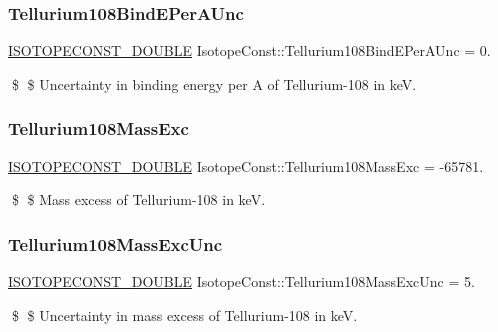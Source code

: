 \subsubsection{\texorpdfstring{Tellurium108\+Bind\+E\+Per\+A\+Unc}{Tellurium108BindEPerAUnc}}
{\footnotesize\ttfamily \mbox{\hyperlink{group___isotope_const-_macros_ga8f45a7272ce02c0b4c65c44636ed719a}{I\+S\+O\+T\+O\+P\+E\+C\+O\+N\+S\+T\+\_\+\+D\+O\+U\+B\+LE}} Isotope\+Const\+::\+Tellurium108\+Bind\+E\+Per\+A\+Unc = 0.}

\$ \$ Uncertainty in binding energy per A of Tellurium-\/108 in keV. \mbox{\label{group___isotope_const-_tellurium-_te108_gacee0f3c162c16f19442b01ae34e2942d}} 
\subsubsection{\texorpdfstring{Tellurium108\+Mass\+Exc}{Tellurium108MassExc}}
{\footnotesize\ttfamily \mbox{\hyperlink{group___isotope_const-_macros_ga8f45a7272ce02c0b4c65c44636ed719a}{I\+S\+O\+T\+O\+P\+E\+C\+O\+N\+S\+T\+\_\+\+D\+O\+U\+B\+LE}} Isotope\+Const\+::\+Tellurium108\+Mass\+Exc = -\/65781.}

\$ \$ Mass excess of Tellurium-\/108 in keV. \mbox{\label{group___isotope_const-_tellurium-_te108_ga1a0945dfc114f9998a501945479aa33d}} 
\subsubsection{\texorpdfstring{Tellurium108\+Mass\+Exc\+Unc}{Tellurium108MassExcUnc}}
{\footnotesize\ttfamily \mbox{\hyperlink{group___isotope_const-_macros_ga8f45a7272ce02c0b4c65c44636ed719a}{I\+S\+O\+T\+O\+P\+E\+C\+O\+N\+S\+T\+\_\+\+D\+O\+U\+B\+LE}} Isotope\+Const\+::\+Tellurium108\+Mass\+Exc\+Unc = 5.}

\$ \$ Uncertainty in mass excess of Tellurium-\/108 in keV. \mbox{\label{group___isotope_const-_tellurium-_te108_gaf9d084e227d663682deaf54f37b347a9}} 
